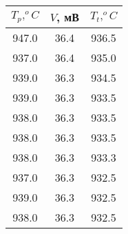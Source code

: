 \begin{tabular}{ccc}
\toprule
$T_{p}, ^oC$ & $V$, мВ & $T_{t}, ^oC$ \\
\midrule
947.0 & 36.4 & 936.5 \\
937.0 & 36.4 & 935.0 \\
939.0 & 36.3 & 934.5 \\
939.0 & 36.3 & 933.5 \\
938.0 & 36.3 & 933.5 \\
938.0 & 36.3 & 933.5 \\
938.0 & 36.3 & 933.3 \\
937.0 & 36.3 & 932.5 \\
939.0 & 36.3 & 932.5 \\
938.0 & 36.3 & 932.5 \\
\bottomrule
\end{tabular}
